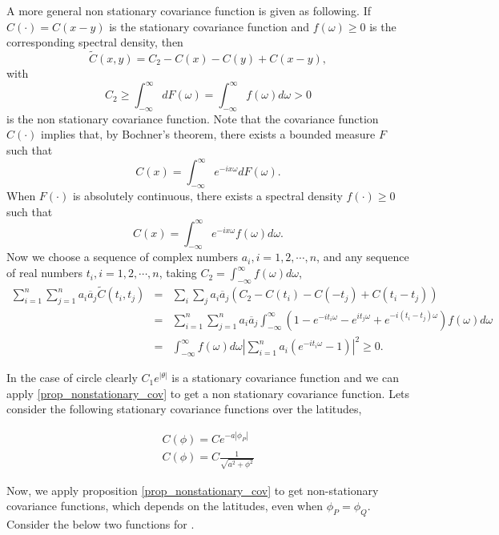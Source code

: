 			\begin{prop} \label{prop_nonstationary_cov}
				A more general non stationary covariance function is given as following. If $C(\cdot) = C(x-y)$ is the stationary covariance function and $f(\omega) \ge 0$ is the corresponding spectral density, then
				\[
					\tilde{C}(x, y) = C_2 - C(x) - C(y) + C(x-y), 
				\]
				with 
				\[
					C_2 \ge \int_{-\infty}^\infty dF(\omega) = \int_{-\infty}^\infty f(\omega)d\omega > 0
				\]
				is the non stationary covariance function. Note that the covariance function $C(\cdot)$ implies that, by Bochner's theorem, there exists a bounded measure $F$ such that
				\[
					C(x) = \int_{-\infty}^\infty e^{-ix\omega}dF(\omega).
				\]
				When $F(\cdot)$ is absolutely continuous, there exists a spectral density $f(\cdot) \ge 0$ such that
				\[
					C(x) = \int_{-\infty}^\infty e^{-ix\omega}f(\omega)d\omega.
				\]
				Now we choose a sequence of complex numbers $a_i, i = 1, 2, \cdots, n$, and any sequence of real numbers $t_i, i = 1, 2, \cdots, n$, taking $C_2 = \int_{-\infty}^\infty f(\omega)d\omega$,
				\begin{eqnarray*}
					\sum_{i=1}^n \sum_{j=1}^n a_i \overline{a}_j \tilde{C}(t_i, t_j) &=& \sum_i \sum_j a_i \overline{a}_j (C_2 - C(t_i) - C(-t_j) + C(t_i-t_j)) \\
					&=& \sum_{i=1}^n \sum_{j=1}^n a_i \overline{a}_j \int_{-\infty}^\infty(1-  e^{-it_i\omega} - e^{it_j\omega} + e^{-i(t_i-t_j)\omega})f(\omega)d\omega \\
					&=&\int_{-\infty}^\infty f(\omega)d\omega \left|\sum_{i=1}^n a_i(e^{-it_i\omega} - 1)\right|^2 \ge 0.
				\end{eqnarray*}
			\end{prop}
					
			
			
			In the case of circle clearly $C_1e^{|\theta|}$ is a stationary covariance function and we can apply \ref{prop_nonstationary_cov} to get a non stationary covariance function. Lets consider the following stationary covariance functions over the latitudes,
					      		
			\begin{eqnarray*}
				C(\phi) = Ce^{-a|\phi_P|} \\
				C(\phi) = C\frac{1}{\sqrt{a^2+\phi^2}}
			\end{eqnarray*}
			
			Now, we apply proposition \ref{prop_nonstationary_cov} to get non-stationary covariance functions, which depends on the latitudes, even when $\phi_P = \phi_Q$. Consider the below two functions for \Cm.
					      		      
